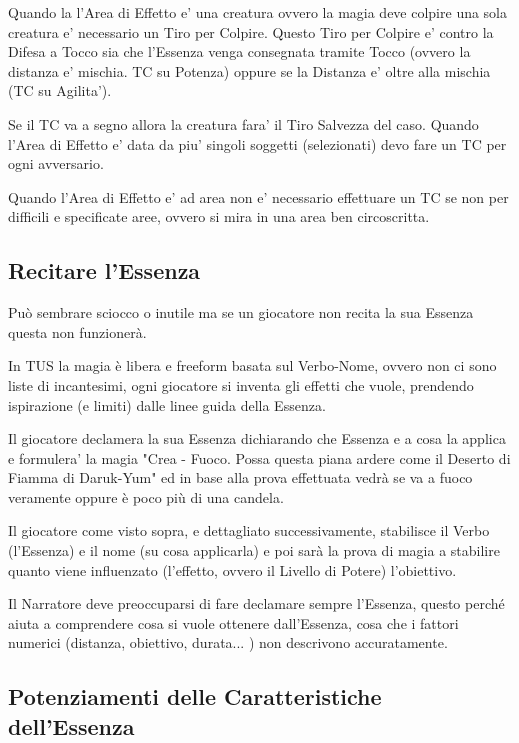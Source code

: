 \documentclass[a4paper,11pt,twoside,openany]{book}
\begin{document}
Quando la l'Area di Effetto e' una creatura ovvero la magia deve colpire una sola creatura e' necessario un Tiro per Colpire.
Questo Tiro per Colpire e' contro la Difesa a Tocco sia che l'Essenza venga consegnata tramite Tocco (ovvero la distanza e' mischia. TC su Potenza) oppure se la Distanza e' oltre alla mischia (TC su Agilita').

Se il TC va a segno allora la creatura fara' il Tiro Salvezza del caso.
Quando l'Area di Effetto e' data da piu' singoli soggetti (selezionati) devo fare un TC per ogni avversario.

Quando l'Area di Effetto e' ad area non e' necessario effettuare un TC se non per difficili e specificate aree, ovvero si mira in una area ben circoscritta.


\subsection{Recitare l'Essenza}

\label{recitare-lessenza}

Può sembrare sciocco o inutile ma se un giocatore non recita la sua Essenza questa non funzionerà.

In TUS la magia è libera e freeform basata sul Verbo-Nome, ovvero non ci sono liste di incantesimi, ogni giocatore si inventa gli effetti che vuole, prendendo ispirazione (e limiti) dalle linee guida della Essenza.

Il giocatore declamera la sua Essenza dichiarando che Essenza e a cosa la applica e formulera' la magia "Crea - Fuoco. Possa questa piana ardere come il Deserto di Fiamma di Daruk-Yum" ed in base alla prova effettuata vedrà se va a fuoco veramente oppure è poco più di una candela.

Il giocatore come visto sopra, e dettagliato successivamente, stabilisce il Verbo (l'Essenza) e il nome (su cosa applicarla) e poi sarà la prova di magia a stabilire quanto viene influenzato (l'effetto, ovvero il Livello di Potere) l'obiettivo.

Il Narratore deve preoccuparsi di fare declamare sempre l'Essenza, questo perché aiuta a comprendere cosa si vuole ottenere dall'Essenza, cosa che i fattori numerici (distanza, obiettivo, durata... ) non descrivono accuratamente.

\subsection{Potenziamenti delle Caratteristiche dell'Essenza}
\end{document}
